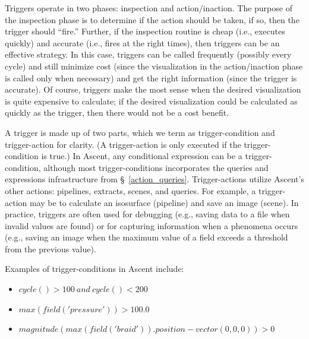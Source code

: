 Triggers operate in two phases: inspection and action/inaction.
%
The purpose of the inspection phase is to determine if the action should be taken, if so, then
the trigger should ``fire.''
%
Further, if the inspection routine is cheap (i.e., executes quickly) and accurate (i.e.,
fires at the right times), then
triggers can be an effective strategy.
%
In this case, triggers can be called frequently (possibly every cycle) and still minimize cost
(since the visualization in the action/inaction phase is called only when necessary) and
get the right information (since the trigger is accurate).
%
Of course, triggers make the most sense when the desired visualization is quite expensive
to calculate;
if the desired visualization could be calculated as quickly as the trigger, then there would
not be a cost benefit.





%
%
%
%

A trigger is made up of two parts, which we term as trigger-condition and trigger-action
for clarity.  
(A trigger-action is only executed if the trigger-condition is true.)
%
In Ascent, any conditional expression can be a trigger-condition, although most trigger-conditions
incorporates the queries and expressions infrastructure from
\S~\ref{action_queries}.
%
Trigger-actions utilize Ascent's other actions: pipelines, extracts, scenes, and
queries.  
%
For example, a trigger-action may be to calculate an isosurface (pipeline) and save
an image (scene).
%
In practice, triggers are often used for debugging (e.g., saving data to
a file when invalid values are found) or 
for capturing information when a phenomena occurs
(e.g., saving an image when the maximum value of a field exceeds a threshold from the
previous value).
%

Examples of trigger-conditions in Ascent include:
\begin{itemize}
\item $cycle() > 100 \ and \ cycle() < 200$
\item $max(field('pressure')) > 100.0$
\item $magnitude(max(field('braid')).position - vector(0,0,0)) > 0$
\end{itemize}
